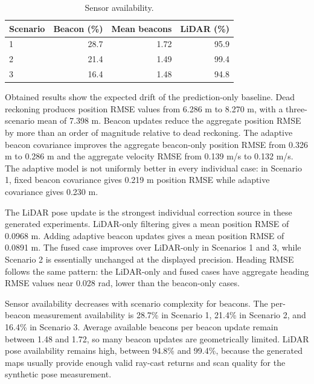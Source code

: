 \begin{table}
\centering
\scriptsize
\caption{Sensor availability.}
\label{tab:availability}
\begin{tabular}{lrrr}
\toprule
Scenario & Beacon (\%) & Mean beacons & LiDAR (\%)\\
\midrule
1 & 28.7 & 1.72 & 95.9\\
2 & 21.4 & 1.49 & 99.4\\
3 & 16.4 & 1.48 & 94.8\\
\bottomrule
\end{tabular}
\end{table}

Obtained results show the expected drift of the prediction-only baseline. Dead reckoning produces position RMSE values from 6.286 m to 8.270 m, with a three-scenario mean of 7.398 m. Beacon updates reduce the aggregate position RMSE by more than an order of magnitude relative to dead reckoning. The adaptive beacon covariance improves the aggregate beacon-only position RMSE from 0.326 m to 0.286 m and the aggregate velocity RMSE from 0.139 m/s to 0.132 m/s. The adaptive model is not uniformly better in every individual case: in Scenario 1, fixed beacon covariance gives 0.219 m position RMSE while adaptive covariance gives 0.230 m.

The LiDAR pose update is the strongest individual correction source in these generated experiments. LiDAR-only filtering gives a mean position RMSE of 0.0968 m. Adding adaptive beacon updates gives a mean position RMSE of 0.0891 m. The fused case improves over LiDAR-only in Scenarios 1 and 3, while Scenario 2 is essentially unchanged at the displayed precision. Heading RMSE follows the same pattern: the LiDAR-only and fused cases have aggregate heading RMSE values near 0.028 rad, lower than the beacon-only cases.

Sensor availability decreases with scenario complexity for beacons. The per-beacon measurement availability is 28.7\% in Scenario 1, 21.4\% in Scenario 2, and 16.4\% in Scenario 3. Average available beacons per beacon update remain between 1.48 and 1.72, so many beacon updates are geometrically limited. LiDAR pose availability remains high, between 94.8\% and 99.4\%, because the generated maps usually provide enough valid ray-cast returns and scan quality for the synthetic pose measurement.
